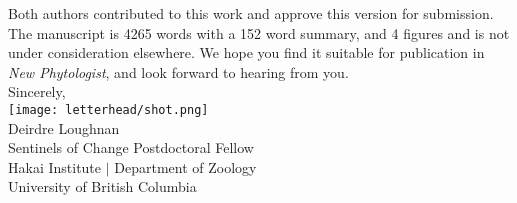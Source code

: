 \documentclass[11pt,a4paper]{article}
\begin{document}
\noindent Both authors contributed to this work and approve this version for submission. The manuscript is 4265 words with a 152 word summary, and 4 figures and is not under consideration elsewhere. We hope you find it suitable for publication in \emph{New Phytologist}, and look forward to hearing from you. 
\vspace{1.5ex}\\
\noindent Sincerely, \\
\texttt{[image: letterhead/shot.png]} \\ 
\noindent Deirdre Loughnan\\
\noindent Sentinels of Change Postdoctoral Fellow\\ %
\noindent Hakai Institute $|$ Department of Zoology\\
\noindent University of British Columbia
\newpage
\vspace{-5ex}
% 


\newpage
\end{document}
